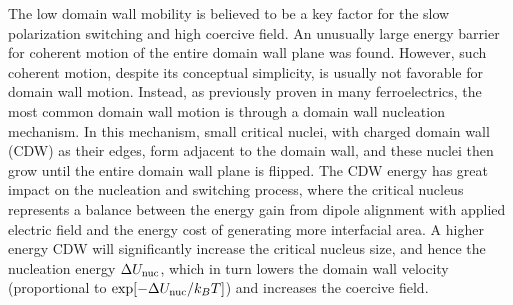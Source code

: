\documentclass[12pt]{article}
\begin{document}
The low domain wall mobility is believed to be a key factor for the slow polarization switching and high coercive field. 
An unusually large energy barrier for coherent motion of the entire domain wall plane was found\cite{lee20p1343,ding20p556,zhao22p064104}.
However, such coherent motion, despite its conceptual simplicity, is usually not favorable for domain wall motion. 
Instead, as previously proven in many ferroelectrics, the most common domain wall motion is through a domain wall nucleation mechanism.
In this mechanism, small critical nuclei, with charged domain wall (CDW) as their edges, form adjacent to the domain wall, and these nuclei then grow until the entire domain wall plane is flipped\cite{shin07p881,liu16p360,tybell02p097601,hayashi72p616,miller60p1460}. 
The CDW energy has great impact on the nucleation and switching process, where the critical nucleus represents a balance between the energy gain from dipole alignment with applied electric field and the energy cost of generating more interfacial area.
A higher energy CDW will significantly increase the critical nucleus size, and hence the nucleation energy $\Delta U_{\rm{nuc}}$, which in turn lowers the domain wall velocity (proportional to $\exp[-\Delta U_{\rm{nuc}}/k_BT]$) and increases the coercive field\cite{liu16p360,shin07p881,merz54p690}.
\end{document}

